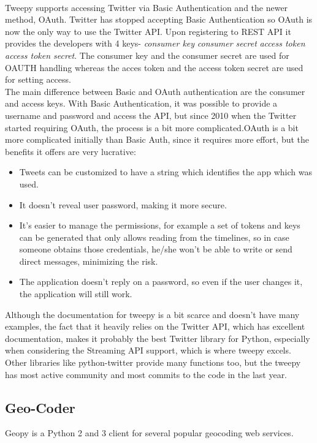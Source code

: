 \paragraph{}
Tweepy supports accessing Twitter via Basic Authentication and the newer method, OAuth. Twitter has stopped accepting Basic Authentication so OAuth is now the only way to use the Twitter API.
Upon registering to REST API it provides the developers with 4 keys-
\textit{consumer key} \textit{consumer secret} \textit{access token} \textit{access token secret}.
The consumer key and the consumer secret are used for OAUTH handling whereas the acces token and the access token secret are used for setting access.\\
The main difference between Basic and OAuth authentication are the consumer and access keys. With Basic Authentication, it was possible to provide a username and password and access the API, but since 2010 when the Twitter started requiring OAuth, the process is a bit more complicated.OAuth is a bit more complicated initially than Basic Auth, since it requires more effort, but the benefits it offers are very lucrative:
\begin{itemize}
    \item Tweets can be customized to have a string which identifies the app which was used.
    \item It doesn’t reveal user password, making it more secure.
    \item It's easier to manage the permissions, for example a set of tokens and keys can be generated that only allows reading from the timelines, so in case someone obtains those credentials, he/she won’t be able to write or send direct messages, minimizing the risk.
    \item The application doesn't reply on a password, so even if the user changes it, the application will still work.
\end{itemize}
Although the documentation for tweepy is a bit scarce and doesn't have many examples, the fact that it heavily relies on the Twitter API, which has excellent documentation, makes it probably the best Twitter library for Python, especially when considering the Streaming API support, which is where tweepy excels. Other libraries like python-twitter provide many functions too, but the tweepy has most active community and most commits to the code in the last year.
\subsection{Geo-Coder}
Geopy is a Python 2 and 3 client for several popular geocoding web services.

